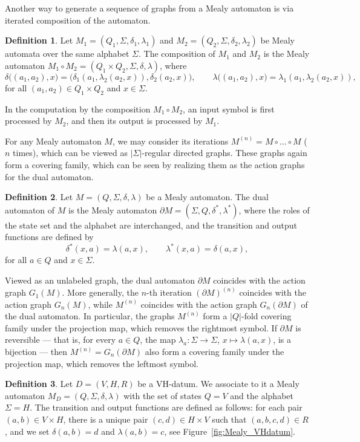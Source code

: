 \documentclass[12pt]{article}
\theoremstyle{definition}
\newtheorem{definition}{Definition}
\begin{document}
Another way to generate a sequence of graphs from a Mealy automaton is via iterated composition of the automaton.
\begin{definition}
Let $M_1=(Q_1, \Sigma, \delta_1, \lambda_1)$ and $M_2=(Q_2, \Sigma, \delta_2, \lambda_2)$ be Mealy automata over the same alphabet $\Sigma$.
The composition of $M_1$ and $M_2$ is the Mealy automaton
$M_1 \circ M_2 = (Q_1 \times Q_2, \Sigma, \delta, \lambda)$,
where
\[
\delta\big((a_1,a_2), x\big) = \big(\delta_1(a_1, \lambda_2(a_2,x)), \delta_2(a_2, x) \big),
\qquad
\lambda\big((a_1,a_2), x\big) = \lambda_1(a_1, \lambda_2(a_2,x)),
\]
for all $(a_1,a_2)\in Q_1 \times Q_2$ and $x\in \Sigma$.
\end{definition}

In the computation by the composition $M_1 \circ M_2$, an input symbol is first processed by $M_2$, and then its output is processed by $M_1$.

For any Mealy automaton $M$, we may consider its iterations $M^{(n)}=M\circ\ldots \circ M$ ($n$ times), which can be viewed as $|\Sigma|$-regular directed graphs. These graphs again form a covering family, which can be seen by realizing them as the action graphs for the dual automaton.

\begin{definition}
Let $M=(Q,\Sigma,\delta,\lambda)$ be a Mealy automaton.
The dual automaton of $M$ is the Mealy automaton $\partial M=(\Sigma, Q, \delta^*, \lambda^*)$, where the roles of the state set and the alphabet are interchanged, and the transition and output functions are defined by
\[
\delta^*(x,a) = \lambda(a,x), \qquad \lambda^*(x,a) = \delta(a,x),
\]
for all $a\in Q$ and $x\in \Sigma$.
\end{definition}

Viewed as an unlabeled graph, the dual automaton $\partial M$ coincides with the action graph $G_1(M)$. More generally, the $n$-th iteration $(\partial M)^{(n)}$ coincides with the action graph $G_n(M)$, while $M^{(n)}$ coincides with the action graph $G_n(\partial M)$ of the dual automaton. In particular, the graphs $M^{(n)}$ form a $|Q|$-fold covering family under the projection map, which removes the rightmost symbol. If $\partial M$ is reversible --- that is, for every $a\in Q$, the map $\lambda_a:\Sigma\rightarrow\Sigma$, $x\mapsto \lambda(a,x)$, is a bijection --- then $M^{(n)}=G_n(\partial M)$ also form a covering family under the projection map, which removes the leftmost symbol.

\begin{definition}
Let $D=(V,H,R)$ be a VH-datum. We associate to it a Mealy automaton $M_D=(Q,\Sigma,\delta,\lambda)$ with the set of states $Q=V$ and the alphabet $\Sigma=H$. The transition and output functions are defined as follows: for each pair $(a,b)\in V\times H$, there is a unique pair $(c,d)\in H\times V$ such that $(a,b,c,d)\in R$, and we set $\delta(a,b)=d$ and $\lambda(a,b)=c$, see Figure~\ref{fig:Mealy_VHdatum}.
\end{definition}
\end{document}

